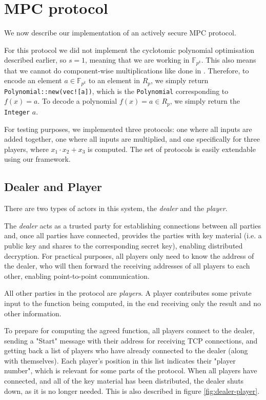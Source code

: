 \documentclass[../main.tex]{subfiles}
\begin{document}
\section{MPC protocol}
We now describe our implementation of an actively secure MPC protocol.

For this protocol we did not implement the cyclotomic polynomial optimisation described earlier, so $s = 1$, meaning that we are working in $\mathbb{F}_{p^k}$.
This also means that we cannot do component-wise multiplications like done in \cite{damgaard2012multiparty}.
Therefore, to encode an element $a \in \mathbb{F}_{p^k}$ to an element in $R_p$, we simply return \lstinline{Polynomial::new(vec![a])}, which is the \lstinline{Polynomial} corresponding to $f(x) = a$. To decode a polynomial $f(x) = a \in R_p$, we simply return the \lstinline{Integer} $a$.

For testing purposes, we implemented three protocols: one where all inputs are added together, one where all inputs are multiplied, and one specifically for three players, where $x_1 \cdot x_2 + x_3$ is computed. The set of protocols is easily extendable using our framework.

\subsection{Dealer and Player}

There are two types of actors in this system, the \textit{dealer} and the \textit{player}.

The \textit{dealer} acts as a trusted party for establishing connections between all parties and, once all parties have connected, provides the parties with key material (i.e. a public key and shares to the corresponding secret key), enabling distributed decryption.
For practical purposes, all players only need to know the address of the dealer, who will then forward the receiving addresses of all players to each other, enabling point-to-point communication.

All other parties in the protocol are \textit{players}.
A player contributes some private input to the function being computed, in the end receiving only the result and no other information.

To prepare for computing the agreed function, all players connect to the dealer, sending a "Start" message with their address for receiving TCP connections, and getting back a list of players who have already connected to the dealer (along with themselves).
Each player's position in this list indicates their "player number", which is relevant for some parts of the protocol.
When all players have connected, and all of the key material has been distributed, the dealer shuts down, as it is no longer needed.
This is also described in figure \ref{fig:dealer-player}.
\end{document}
